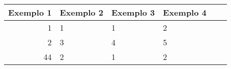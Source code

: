 \begin{quadro}[H]
\tiny
\label{Quadro:exemplo1}
\begin{tabular}{|r|l|l|l|l|l|}
\hline
Exemplo 1 & Exemplo 2 & Exemplo 3 & Exemplo 4 \\ \hline
1         & 1         & 1         & 2         \\ \hline
2         & 3         & 4         & 5         \\ \hline
44        & 2         & 1         & 2         \\ \hline
\end{tabular}
\end{quadro}
